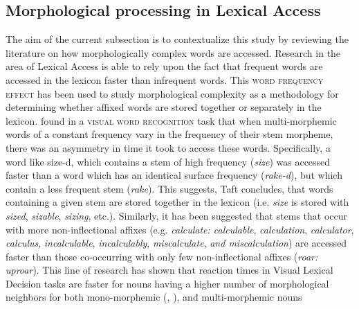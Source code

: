 \documentclass[output=paper,modfonts]{langscibook}
\begin{document}
\subsection{Morphological processing in Lexical Access}\label{sec:kloehn:1.3}


The aim of the current subsection is to contextualize this study by reviewing the literature on how morphologically complex words are accessed. Research in the area of Lexical Access is able to rely upon the fact that frequent words are accessed in the lexicon faster than infrequent words. This \textsc{word frequency effect} \citep{Broadbent1967} has been used to study morphological complexity as a methodology for determining whether affixed words are stored together or separately in the lexicon. \citet{Taft1979} found in a \textsc{visual word recognition} task that when multi-morphemic words of a constant frequency vary in the frequency of their stem morpheme, there was an asymmetry in time it took to access these words. Specifically, a word like size-d, which contains a stem of high frequency (\textit{size}) was accessed faster than a word which has an identical surface frequency (\textit{rake-d}), but which contain a less frequent stem (\textit{rake}). This suggests, Taft concludes, that words containing a given stem are stored together in the lexicon (i.e. \textit{size} is stored with \textit{sized}, \textit{sizable}, \textit{sizing}, etc.). Similarly, it has been suggested that stems that occur with more non-inflectional affixes (e.g. \textit{calculate: calculable}, \textit{calculation}, \textit{calculator}, \textit{calculus}, \textit{incalculable}, \textit{incalculably}, \textit{miscalculate}, \textit{and miscalculation}) are accessed faster than those co-occurring with only few non-inflectional affixes (\textit{roar: uproar}). This line of research has shown that reaction times in Visual Lexical Decision tasks are faster for nouns having a higher number of morphological neighbors for both mono-morphemic (\citealt{BaayenEtAl2007}, \citealt{DeJongEtAl2000}), and multi-morphemic nouns \citep{BertramEtAl2000} 
\end{document}
